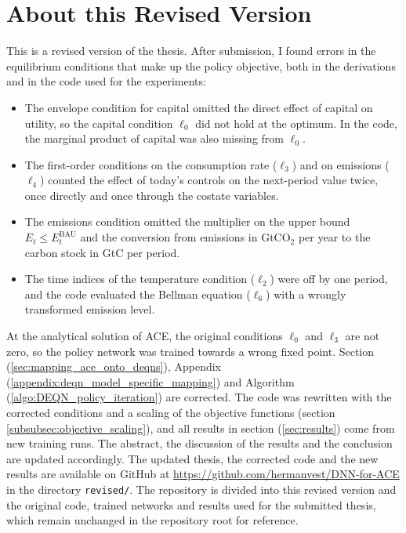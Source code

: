 \section*{About this Revised Version}

This is a revised version of the thesis. After submission, I found errors in the equilibrium conditions that make up the policy objective, both in the derivations and in the code used for the experiments:

\begin{itemize}
    \item The envelope condition for capital omitted the direct effect of capital on utility, so the capital condition \(\ell_0\) did not hold at the optimum. In the code, the marginal product of capital was also missing from \(\ell_0\).
    \item The first-order conditions on the consumption rate (\(\ell_3\)) and on emissions (\(\ell_4\)) counted the effect of today's controls on the next-period value twice, once directly and once through the costate variables.
    \item The emissions condition omitted the multiplier on the upper bound \(E_t \leq E_t^{\text{BAU}}\) and the conversion from emissions in GtCO\(_2\) per year to the carbon stock in GtC per period.
    \item The time indices of the temperature condition (\(\ell_2\)) were off by one period, and the code evaluated the Bellman equation (\(\ell_6\)) with a wrongly transformed emission level.
\end{itemize}

At the analytical solution of ACE, the original conditions \(\ell_0\) and \(\ell_3\) are not zero, so the policy network was trained towards a wrong fixed point. Section (\ref{sec:mapping_ace_onto_deqns}), Appendix (\ref{appendix:deqn_model_specific_mapping}) and Algorithm (\ref{algo:DEQN_policy_iteration}) are corrected. The code was rewritten with the corrected conditions and a scaling of the objective functions (section \ref{subsubsec:objective_scaling}), and all results in section (\ref{sec:results}) come from new training runs. The abstract, the discussion of the results and the conclusion are updated accordingly. The updated thesis, the corrected code and the new results are available on GitHub at \url{https://github.com/hermanvest/DNN-for-ACE} in the directory \texttt{revised/}. The repository is divided into this revised version and the original code, trained networks and results used for the submitted thesis, which remain unchanged in the repository root for reference.
